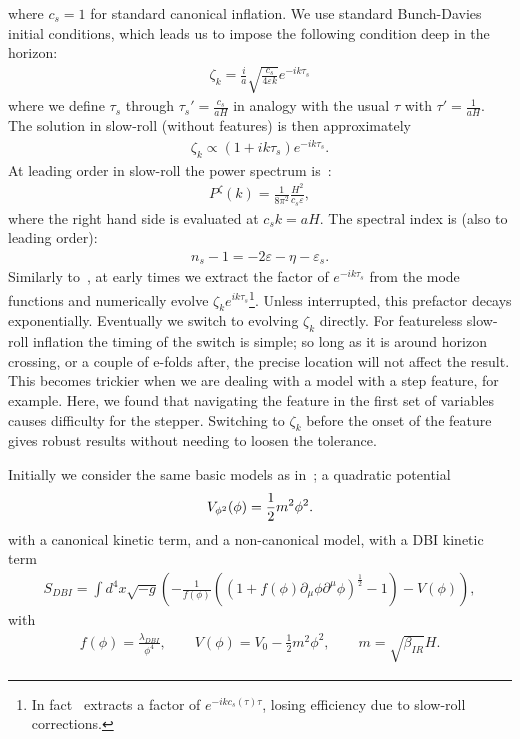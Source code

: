 where $c_s=1$ for standard canonical inflation.
We use standard Bunch-Davies initial conditions,
which leads us to impose the following condition deep in the horizon:
\begin{align}\label{bd_ic}
\zeta_k = \frac{i}{a}\sqrt{\frac{c_s}{4\varepsilon k}} e^{-ik\tau_s}
\end{align}
where we define $\tau_s$ through $\tau_s'=\frac{c_s}{aH}$
in analogy with the usual $\tau$ with $\tau'=\frac{1}{aH}$.
The solution in slow-roll (without features) is then approximately
\begin{align}\label{modefnsapprox}
    \zeta_k \propto (1+ik\tau_s)e^{-ik\tau_s}.
\end{align}
At leading order in slow-roll the power spectrum is~\cite{mukhanov_1999,chen_ng_0605}:
\begin{align}
P^{\zeta}(k) = \frac{1}{8\pi^2}\frac{H^2}{c_s\varepsilon},
\end{align}
where the right hand side is evaluated at $c_{s}k=aH$.
The spectral index is (also to leading order):
\begin{align}
n_s-1 = -2\varepsilon-\eta-\varepsilon_s.
\end{align}
Similarly to~\cite{Funakoshi}, at early times we extract the factor of $e^{-ik\tau_s}$ from the mode functions
and numerically evolve $\zeta_ke^{ik\tau_s}$\footnote{
    In fact~\cite{Funakoshi} extracts a factor of $e^{-ikc_s(\tau)\tau}$, losing efficiency
    due to slow-roll corrections.
}.
Unless interrupted, this prefactor decays exponentially.
Eventually we switch to evolving $\zeta_k$ directly.
For featureless slow-roll inflation the timing of the switch is simple;
so long as it is around horizon crossing, or a couple of e-folds after,
the precise location will not affect the result.
This becomes trickier when we are dealing with a model with
a step feature, for example.
Here, we found that navigating the feature in the first set of variables
causes difficulty for the stepper.
Switching to $\zeta_k$ before the onset of the feature
gives robust results without needing to loosen the tolerance.


Initially we consider the same basic models as in~\cite{Funakoshi};
a quadratic potential
\begin{align}\label{eq:quadratic_potential}
    V_{\phi^2}(\phi) = \frac{1}{2}m^2\phi^2.
\end{align}
with a canonical kinetic term,
and a non-canonical model, with a DBI
kinetic term
\begin{align}\label{eq:dbi_action}
    S_{DBI}=\int d^4x\sqrt{-g}\left(-\frac{1}{f(\phi)}\left(\left(1+f(\phi)\partial_\mu\phi\partial^\mu\phi\right)^{\frac{1}{2}}-1\right)-V(\phi)\right),
\end{align}
with
\begin{align}\label{eq:dbi_warp}
    f(\phi)=\frac{\lambda_{DBI}}{\phi^4},\qquad
    V(\phi)=V_0-\frac{1}{2}m^2\phi^2,\qquad
    m=\sqrt{\beta_{IR}}H.
\end{align}

